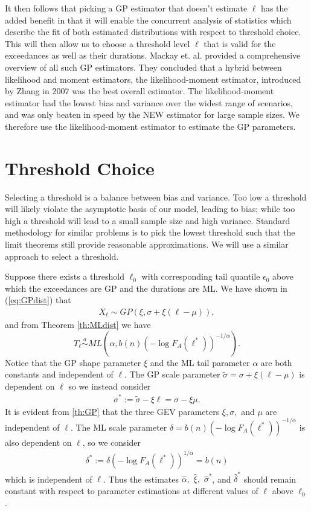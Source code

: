 \documentclass[honours,12pt]{unswthesis}
\newcommand{\1}{\mathbf 1}
\numberwithin{equation}{section}
\theoremstyle{definition}
\theoremstyle{remark}
\begin{document}
It then follows that picking a GP estimator that doesn't estimate $\ell$ has the added benefit in that it will enable the concurrent analysis of statistics which describe the fit of both estimated distributions with respect to threshold choice. This will then allow us to choose a threshold level $\ell$ that is valid for the exceedances as well as their durations. Mackay et. al. \cite{Mackay2011} provided a comprehensive overview of all such GP estimators. They concluded that a hybrid between likelihood and moment estimators, the likelihood-moment estimator, introduced by Zhang in 2007 \cite{Zhang2007} was the best overall estimator. The likelihood-moment estimator had the lowest bias and variance over the widest range of scenarios, and was only beaten in speed by the NEW estimator \cite{Zhang2009} for large sample sizes. We therefore use the likelihood-moment estimator to estimate the GP parameters.

\section{Threshold Choice}
Selecting a threshold is a balance between bias and variance. Too low a threshold will likely violate the asymptotic basis of our model, leading to bias; while too high a threshold will lead to a small sample size and high variance. Standard methodology for similar problems is to pick the lowest threshold such that the limit theorems still provide reasonable approximations. We will use a similar approach to select a threshold. 

Suppose there exists a threshold $\ell_0$ with corresponding tail quantile $\epsilon_0$ above which the exceedances are GP and the durations are ML. We have shown in (\ref{eq:GPdist}) that
\begin{align*}
X_\ell\sim GP(\xi,\sigma+\xi(\ell-\mu)),
\end{align*}
and from Theorem \ref{th:MLdist} we have
\[
	T_\ell\overset{a}{\sim}ML\left(\alpha, b(n)(-\log F_A(\ell^*))^{-1/\alpha}\right).
\]
Notice that the GP shape parameter $\xi$ and the ML tail parameter $\alpha$ are both constants and independent of $\ell$. The GP scale parameter $\tilde \sigma = \sigma+\xi(\ell-\mu)$ is dependent on $\ell$ so we instead consider
\begin{align}\label{eq:sigmaStar}
	\sigma^{*}:=\tilde \sigma -\xi\ell= \sigma-\xi\mu.
\end{align}  
It is evident from \ref{th:GP} that the three GEV parameters $\xi,\sigma,$ and $\mu$ are independent of $\ell$. The ML scale parameter $\delta=b(n)(-\log F_A(\ell^*))^{-1/\alpha}$ is also dependent on $\ell$, so we consider
\begin{align}\label{eq:deltaStar}
	\delta^{*}:=\delta(-\log F_A(\ell^*))^{1/\alpha}=b(n)
\end{align}  
which is independent of $\ell$. Thus the estimates $\hat\alpha,$ $\hat\xi,$ $\hat\sigma^{*}$, and $\hat\delta^{*}$ should remain constant with respect to parameter estimations at different values of $\ell$ above $\ell_0$.
\end{document}
